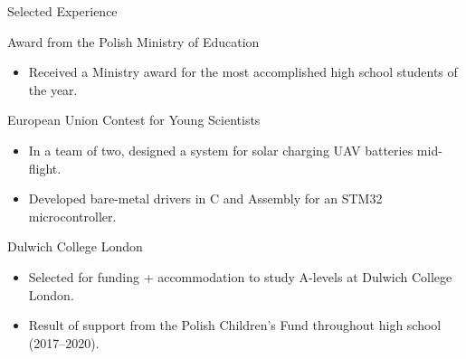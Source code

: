 \documentclass{article}
\newlength{\tabin}
\newlength{\secsep}
\newcommand{\lineunder}{\vspace*{-8pt} \\ \hspace*{-6pt} \hrulefill \\ \vspace*{-15pt}}
\newcommand{\cvlink}[2]{\href{#1}{\nolinkurl{#2}}}
\newenvironment{tabbedsection}[1]{
  \begin{list}{}{
      \setlength{\itemsep}{0pt}
      \setlength{\labelsep}{0pt}
      \setlength{\labelwidth}{0pt}
      \setlength{\leftmargin}{\tabin}
      \setlength{\rightmargin}{\tabin}
      \setlength{\listparindent}{0pt}
      \setlength{\parsep}{0pt}
      \setlength{\parskip}{0pt}
      \setlength{\partopsep}{0pt}
      \setlength{\topsep}{#1}
    }
  \item[]
}{\end{list}}
\newenvironment{resume_section}[1]{
  \filbreak
  \vspace{2\secsep}
  \textsc{\large#1}
  \lineunder
  \begin{tabbedsection}{\secsep}
}{\end{tabbedsection}}
\newenvironment{resume_subsection}[2][]{
  \textbf{#2} \hfill {\footnotesize #1}%
  \begin{tabbedsection}{0.5\secsep}
}{\end{tabbedsection}}
\newenvironment{subitems}{
  \renewcommand{\labelitemi}{-}
  \begin{itemize}
      \setlength{\labelsep}{1em}
}{\end{itemize}}
\begin{document}
\begin{resume_section}{Selected Experience}


  \begin{resume_subsection}[July 2020]{Award from the Polish Ministry of Education}
    \begin{subitems}
      \item Received a Ministry award for the most accomplished high school students of the year.
    \end{subitems}
  \end{resume_subsection}

  \begin{resume_subsection}{European Union Contest for Young Scientists}
    \begin{subitems}
      \item In a team of two, designed a system for solar charging UAV batteries mid-flight.
      \item Developed bare-metal drivers in C and Assembly for an STM32 microcontroller.
    \end{subitems}
  \end{resume_subsection}

  \begin{resume_subsection}{Dulwich College London}
    \begin{subitems}
      \item Selected for funding + accommodation to study A-levels at Dulwich College London.
      \item Result of support from the Polish Children's Fund throughout high school (2017--2020).
    \end{subitems}
  \end{resume_subsection}


\end{resume_section}
\end{document}
